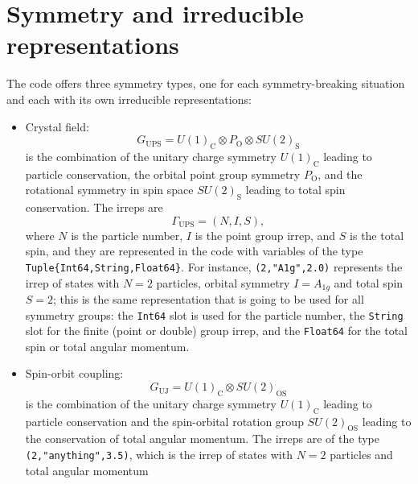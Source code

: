 \documentclass[notitlepage]{article}
\begin{document}
\section{Symmetry and irreducible representations}
\label{symmetry_and_irreducible_representations}
The code offers three symmetry types, one for each
symmetry-breaking situation and each with its own
irreducible representations:
\begin{itemize}
    \item Crystal field:
        \begin{equation}
            G_\text{UPS} = 
            U(1)_\text{C} \otimes
            P_\text{O} \otimes
            SU(2)_\text{S}
        \end{equation}
        is the combination of the unitary charge symmetry
        $U(1)_\text{C}$ leading to particle conservation, the
        orbital point group symmetry $P_\text{O}$, and the
        rotational symmetry in spin space $SU(2)_\text{S}$ leading
        to total spin conservation. The irreps are 
        \begin{equation}
            \Gamma_\text{UPS} = (N,I,S),
        \end{equation}
        where $N$ is the particle number, $I$ is the point
        group irrep, and $S$ is the total spin, and they are
        represented in the code with variables of the type
        \texttt{Tuple\{Int64,String,Float64\}}. For
        instance, \texttt{(2,"A1g",2.0)} represents the
        irrep of states with $N=2$ particles, orbital
        symmetry $I=A_{1g}$ and total spin $S=2$; this is
        the same representation that is going to be used for
        all symmetry groups: the \texttt{Int64} slot is used
        for the particle number, the \texttt{String} slot
        for the finite (point or double) group irrep, and
        the \texttt{Float64} for the total spin or total
        angular momentum.
    \item Spin-orbit coupling:
        \begin{equation}
            G_\text{UJ} =
            U(1)_\text{C} \otimes
            SU(2)_\text{OS}
        \end{equation}
        is the combination of the unitary charge symmetry
        $U(1)_\text{C}$ leading to particle conservation and
        the spin-orbital rotation group $SU(2)_\text{OS}$
        leading to the conservation of total angular
        momentum. The irreps are of the type
        \texttt{(2,"anything",3.5)}, which is the irrep of
        states with $N=2$ particles and total angular momentum

\end{itemize}
\end{document}
